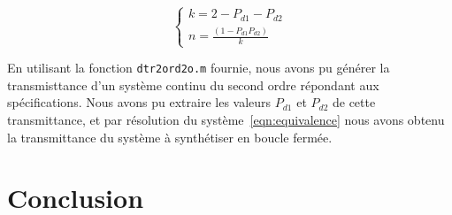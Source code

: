 \begin{equation}
	\begin{cases}
		k = 2-P_{d1}-P_{d2} \\[2mm]
		n = \frac{(1-P_{d1}P_{d2})}{k}
	\end{cases}
	\label{eqn:equivalence}
\end{equation}

En utilisant la fonction \texttt{dtr2ord2o.m} fournie, nous avons pu générer la transmisttance d'un système continu du second ordre répondant aux spécifications.
Nous avons pu extraire les valeurs $P_{d1}$ et $P_{d2}$ de cette transmittance, et par résolution du système~\ref{eqn:equivalence} nous avons obtenu la transmittance du système à synthétiser en boucle fermée.

\section{Conclusion}

